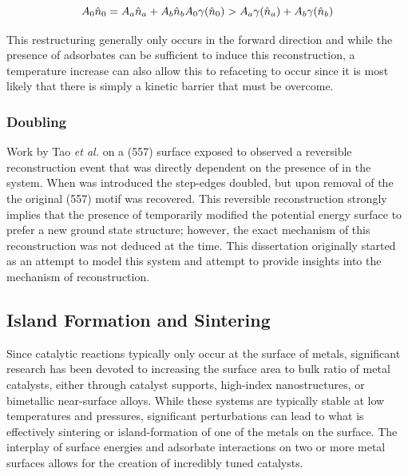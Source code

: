 \begin{equation}
A_0\hat{n}_0 = A_a\hat{n}_a + A_b\hat{n}_b \\
A_0\gamma(\hat{n}_0) > A_a\gamma(\hat{n}_a) + A_b\gamma(\hat{n}_b)
\end{equation}

This restructuring generally only occurs in the forward direction and while the
presence of adsorbates can be sufficient to induce this reconstruction, a
temperature increase can also allow this to refaceting to occur since it is
most likely that there is simply a kinetic barrier that must be overcome.\citep{Williams:1994aa,Jeong:1999aa} 

\subsubsection{Doubling}
Work by Tao {\it et al.} on a  (557) surface exposed to  observed
a reversible reconstruction event that was directly dependent on the presence
of  in the system.\citep{Tao:2011aa} When  was introduced the step-edges doubled,
but upon removal of the  the original (557) motif was recovered. This
reversible reconstruction strongly implies that the presence of 
temporarily modified the potential energy surface to prefer a new ground state
structure; however, the exact mechanism of this reconstruction was not deduced
at the time. This dissertation originally started as an attempt to model this
system and attempt to provide insights into the mechanism of reconstruction. 

\subsection{Island Formation and Sintering}
Since catalytic reactions typically only occur at the surface of metals, significant
research has been devoted to increasing the surface area to bulk ratio of metal
catalysts, either through catalyst supports, high-index nanostructures, or
bimetallic near-surface alloys. While these systems are typically stable at low
temperatures and pressures, significant perturbations can lead to what is
effectively sintering or island-formation of one of the metals on the surface.
The interplay of surface energies and adsorbate interactions on two or more
metal surfaces allows for the creation of incredibly tuned catalysts.
